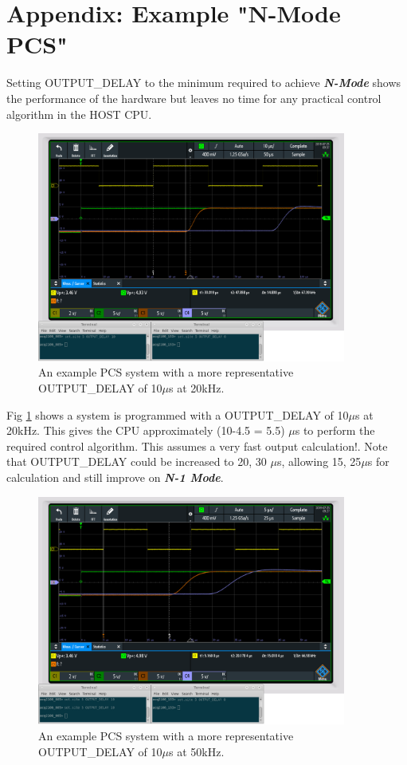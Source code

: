 \documentclass{article}
\begin{document}
\section{Appendix: Example "N-Mode PCS"} \label{nmodepcs}

Setting OUTPUT\_DELAY to the minimum required to achieve \textit{\textbf{N-Mode}} shows the performance of the hardware but leaves no time for any practical control algorithm in the HOST CPU.

\begin{figure}
	\centering
	\includegraphics[width=4.0in]{images/n-mode-pcs-scope-trace-20kHz-2.png}
	\caption{An example PCS system with a more representative OUTPUT\_DELAY of 10$\mu$s at 20kHz.}
	\label{20repscope}
\end{figure}

Fig \ref{20repscope} shows a system is programmed with a OUTPUT\_DELAY of 10$\mu$s at 20kHz.
This gives the CPU approximately (10-4.5 = 5.5) $\mu$s to perform the required control algorithm.
This assumes a very fast output calculation!.
Note that OUTPUT\_DELAY could be increased to 20, 30 $\mu$s, allowing 15, 25$\mu$s for calculation and still improve on \textit{\textbf{N-1 Mode}}.


\begin{figure}
	\centering
	\includegraphics[width=4.0in]{images/n-mode-pcs-scope-trace-50kHz-2.png}
	\caption{An example PCS system with a more representative OUTPUT\_DELAY of 10$\mu$s at 50kHz.}
	\label{50repscope}
\end{figure}
\end{document}
